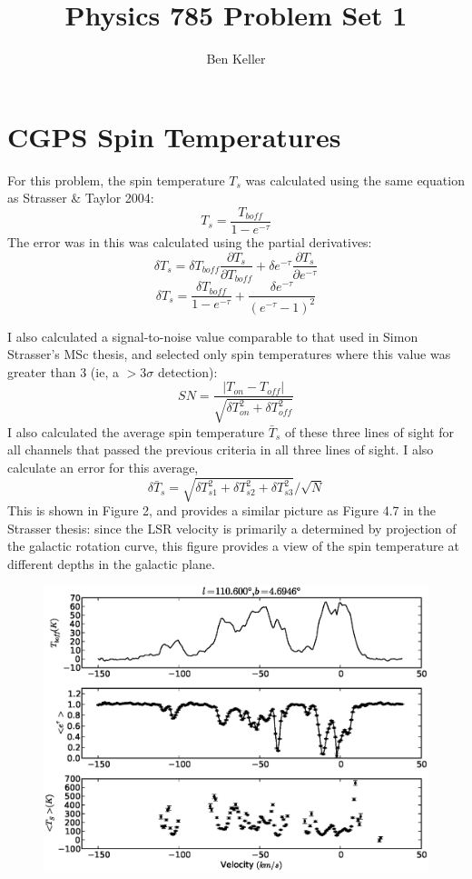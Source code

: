 \documentclass{article}
\author{Ben Keller}
\title{Physics 785 Problem Set 1}
\begin{document}
\maketitle
\section{CGPS Spin Temperatures}
For this problem, the spin temperature $T_s$ was calculated using the same
equation as Strasser \& Taylor 2004:
$$ T_s = \frac{T_{boff}}{1-e^{-\tau}}$$
The error was in this was calculated using the partial derivatives:
$$ \delta T_s = \delta T_{boff} \frac{\partial T_s}{\partial T_{boff}} + \delta
	e^{-\tau} \frac{\partial T_s}{\partial e^{-\tau}}$$
$$ \delta T_s = \frac{\delta T_{boff}}{1-e^{-\tau}} + \frac{\delta
e^{-\tau}}{(e^{-\tau}-1)^2}$$

I also calculated a signal-to-noise value comparable to that used in Simon
Strasser's MSc thesis, and selected only spin temperatures where this value
was greater than 3 (ie, a $>3\sigma$ detection):
$$ SN = \frac{|T_{on}-T_{off}|}{\sqrt{\delta T_{on}^2 + \delta T_{off}^2}} $$
I also calculated the average spin temperature $\bar T_s$ of these three lines 
of sight for all channels that passed the previous criteria in all three lines 
of sight.  I also calculate an error for this average,
$$\delta \bar T_s = \sqrt{\delta T_{s1}^2+\delta T_{s2}^2+\delta
T_{s3}^2}/\sqrt{N}$$
This is shown in Figure 2, and
provides a similar picture as Figure 4.7 in the Strasser thesis:  since the 
LSR velocity is primarily a determined by projection of the galactic rotation
curve, this figure provides a view of the spin temperature at different depths 
in the galactic plane.
\begin{figure}
	\includegraphics[scale=0.65]{110.600_4.6946.eps}
\end{figure}
\end{document}
